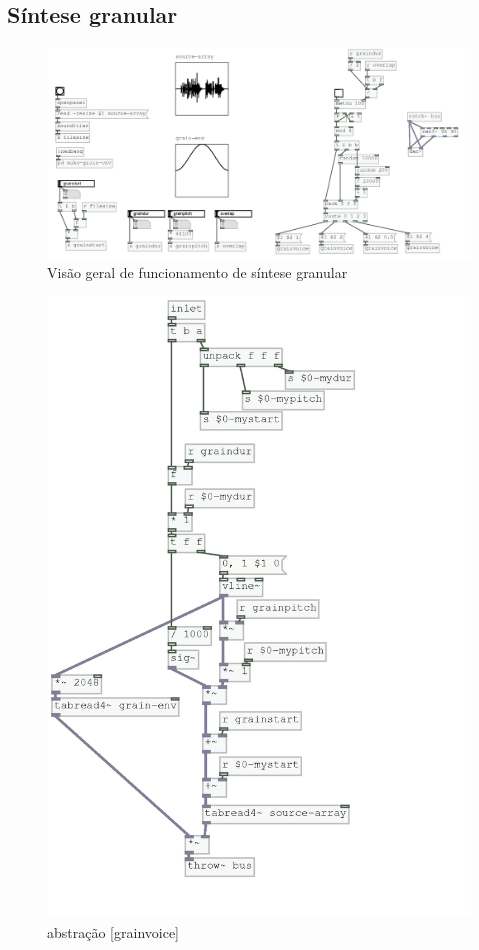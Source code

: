 \documentclass{ppgmus}
\begin{document}

\subsection{Síntese granular}


\begin{figure}[-h]
\includegraphics[scale=.6]{granular-geral}
\caption{Visão geral de funcionamento de síntese granular}
\label{granular-geral}
\end{figure}

\begin{figure}[-h]
\includegraphics[scale=.6]{granular2}
\caption{abstração [grainvoice]}
\label{granular2}
\end{figure}
\end{document}
